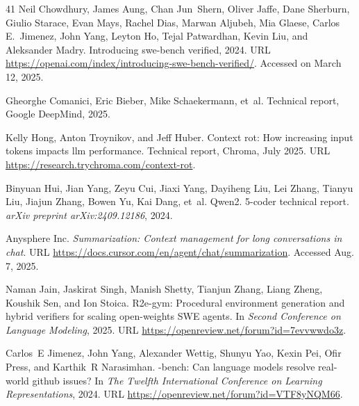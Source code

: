 \documentclass{article}
\begin{document}
\begin{thebibliography}{41}
Neil Chowdhury, James Aung, Chan Jun~Shern, Oliver Jaffe, Dane Sherburn, Giulio Starace, Evan Mays, Rachel Dias, Marwan Aljubeh, Mia Glaese, Carlos E.~Jimenez, John Yang, Leyton Ho, Tejal Patwardhan, Kevin Liu, and Aleksander Madry.
\newblock Introducing swe-bench verified, 2024.
\newblock URL \url{https://openai.com/index/introducing-swe-bench-verified/}.
\newblock Accessed on March 12, 2025.

Gheorghe Comanici, Eric Bieber, Mike Schaekermann, et~al.
\newblock Technical report, Google DeepMind, 2025.

Kelly Hong, Anton Troynikov, and Jeff Huber.
\newblock Context rot: How increasing input tokens impacts llm performance.
\newblock Technical report, Chroma, July 2025.
\newblock URL \url{https://research.trychroma.com/context-rot}.

Binyuan Hui, Jian Yang, Zeyu Cui, Jiaxi Yang, Dayiheng Liu, Lei Zhang, Tianyu Liu, Jiajun Zhang, Bowen Yu, Kai Dang, et~al.
\newblock Qwen2. 5-coder technical report.
\newblock \emph{arXiv preprint arXiv:2409.12186}, 2024.

Anysphere Inc.
\newblock \emph{Summarization: Context management for long conversations in chat}.
\newblock URL \url{https://docs.cursor.com/en/agent/chat/summarization}.
\newblock Accessed Aug. 7, 2025.

Naman Jain, Jaskirat Singh, Manish Shetty, Tianjun Zhang, Liang Zheng, Koushik Sen, and Ion Stoica.
\newblock R2e-gym: Procedural environment generation and hybrid verifiers for scaling open-weights {SWE} agents.
\newblock In \emph{Second Conference on Language Modeling}, 2025.
\newblock URL \url{https://openreview.net/forum?id=7evvwwdo3z}.

Carlos~E Jimenez, John Yang, Alexander Wettig, Shunyu Yao, Kexin Pei, Ofir Press, and Karthik~R Narasimhan.
-bench: Can language models resolve real-world github issues?
\newblock In \emph{The Twelfth International Conference on Learning Representations}, 2024.
\newblock URL \url{https://openreview.net/forum?id=VTF8yNQM66}.


\end{thebibliography}
\end{document}
